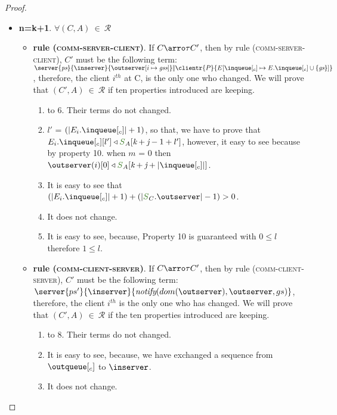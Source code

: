 \begin{proof}
\begin{itemize}
   \item{\bf n=k+1}. $\forall (C,A) \ \in \ \mathcal{R}$
	
			
			\begin{itemize}
				\item {\bf rule (\textsc{comm-server-client})}. If $C \arroi{\tau} C'$, then by rule (\textsc{\footnotesize{comm-server-client}}), $C'$ must be the following term: $\server{\state}{\inserver}{\update{\outserver}{i}{\gss}} \bigpar 
		\clientr{P}{\update{E}{\inclient}{E.\inclient \cup \{\gs\}}}$, therefore, the client $i^{th}$ at C, is the only one who changed. We will prove that $(C',A) \ \in \ \mathcal{R}$ if ten properties introduced are keeping.				
					\begin{enumerate}
						\item to 6. Their terms do not changed.
						\setcounter{enumi}{6}	
							\item $l'$ = $(|E_{i}.\inclient| + 1)$, so that, we have to prove that $E_{i}.\inclient[l'] \triangleleft \queuemessage_A[\tknown + \treceivebuffer - 1 + l']$, however, it easy to see because by property 10. when $m$ = 0 then $\outserver(i)[0] \triangleleft \queuemessage_A[\tknown + \treceivebuffer + |\inclient|]$.
						\item It is easy to see that $(|E_{i}.\inclient| + 1) + (|\queuemessage_C.\outserver|-1) > 0$.
						\item It does not change.
						\item It is easy to see, because, Property 10 is guaranteed with $0 \leq l$ therefore $1 \leq l$. 
					\end{enumerate}
					
					
				\item {\bf rule (\textsc{comm-client-server})}. If $C \arroi{\tau} C'$, then by rule (\textsc{\footnotesize{comm-client-server}}), $C'$ must be the following term: $\server{ps'}{\inserver}{\notify{dom(\outserver)}{\outserver}{gs}}$, therefore, the client $i^{th}$ is the only one who has changed. We will prove that $(C',A) \ \in \ \mathcal{R}$ if the ten properties introduced are keeping.				
					\begin{enumerate}
						\item to 8. Their terms do not changed.
						\setcounter{enumi}{8}	
						\item It is easy to see, because, we have exchanged a sequence from $\outclient$ to $\inserver$. 
						\item It does not change.
						\end{enumerate}
				



\end{itemize}
\end{itemize}
\end{proof}
